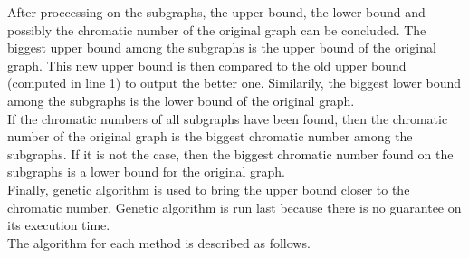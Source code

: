 \documentclass[a4paper]{report}
\begin{document}
	After proccessing on the subgraphs, the upper bound, the lower bound and possibly the chromatic number of the original graph can be concluded. The biggest upper bound among the subgraphs is the upper bound of the original graph. This new upper bound is then compared to the old upper bound (computed in line 1) to output the better one. Similarily, the biggest lower bound among the subgraphs is the lower bound of the original graph. \\
	If the chromatic numbers of all subgraphs have been found, then the chromatic number of the original graph is the biggest chromatic number among the subgraphs. If it is not the case, then the biggest chromatic number found on the subgraphs is a lower bound for the original graph.\\
	Finally, genetic algorithm is used to bring the upper bound closer to the chromatic number. Genetic algorithm is run last because there is no guarantee on its execution time.\\
	The algorithm for each method is described as follows.
	
\end{document}
